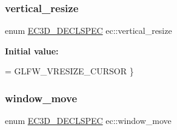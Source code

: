 \mbox{\label{namespaceec_a0608ba5ea3b0115a1133083305516b1e}} 
\subsubsection{\texorpdfstring{vertical\+\_\+resize}{vertical\_resize}}
{\footnotesize\ttfamily enum \mbox{\hyperlink{_common_8h_aac42573e202ca3dd4d259c81691e2369}{E\+C3\+D\+\_\+\+D\+E\+C\+L\+S\+P\+EC}} ec\+::vertical\+\_\+resize\hspace{0.3cm}{\ttfamily [strong]}}

{\bfseries Initial value\+:}
\begin{DoxyCode}
= GLFW\_VRESIZE\_CURSOR
    \}
\end{DoxyCode}
\mbox{\label{namespaceec_a435bfb057b6ec7278b405d423194057b}} 
\subsubsection{\texorpdfstring{window\+\_\+move}{window\_move}}
{\footnotesize\ttfamily enum \mbox{\hyperlink{_common_8h_aac42573e202ca3dd4d259c81691e2369}{E\+C3\+D\+\_\+\+D\+E\+C\+L\+S\+P\+EC}} ec\+::window\+\_\+move\hspace{0.3cm}{\ttfamily [strong]}}

